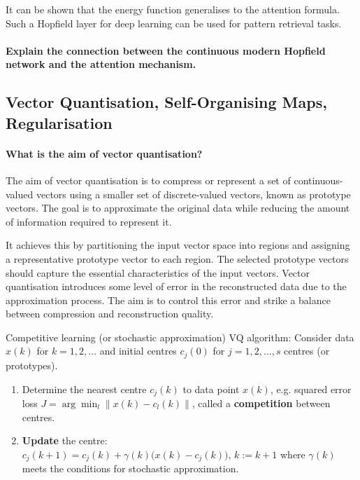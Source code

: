 It can be shown that the energy function generalises to the attention formula.
Such a Hopfield layer for deep learning can be used for pattern retrieval tasks.
\citep{ramsauer2021hopfieldnetworksneed}

\paragraph{Explain the connection between the continuous modern Hopfield network and the attention mechanism.}


\newpage
\subsection{Vector Quantisation, Self-Organising Maps, Regularisation}

\paragraph{What is the aim of vector quantisation?}

The aim of vector quantisation is to compress or represent a set of continuous-valued vectors
using a smaller set of discrete-valued vectors, known as prototype vectors.
The goal is to approximate the original data while
reducing the amount of information required to represent it.

It achieves this by partitioning the input vector space into regions and
assigning a representative prototype vector to each region.
The selected prototype vectors should capture the essential characteristics of the input vectors.
Vector quantisation introduces some level of error in the reconstructed data due to the approximation process.
The aim is to control this error and strike a balance between compression and reconstruction quality.

Competitive learning (or stochastic approximation) VQ algorithm:
Consider data $x(k)$ for $k = 1, 2, \dots$ and initial centres $c_j(0)$ for $j = 1, 2, \dots, s$ centres (or prototypes).

\begin{enumerate}
    \item Determine the nearest centre $c_j(k)$ to data point $x(k)$,
    e.g. squared error loss $J = \arg\min_l{\lVert x(k) - c_l(k) \rVert}$,
    called a \textbf{competition} between centres.
    \item \textbf{Update} the centre: $c_j(k + 1) = c_j(k) + \gamma(k) \big( x(k) - c_j(k) \big), \, k := k + 1$
    where $\gamma(k)$ meets the conditions for stochastic approximation.
\end{enumerate}

